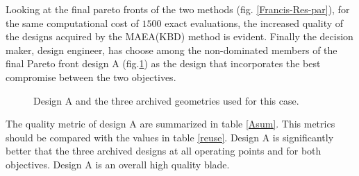 Looking at the final pareto fronts of the two methods (fig. \ref{Francis-Res-par}), for the same computational cost of $1500$ exact evaluations, the increased quality of the designs acquired by the MAEA(KBD) method is evident. Finally the decision maker, design engineer, has choose among the non-dominated members of the final Pareto front design A (fig.\ref{design-bases-a}) as the design that incorporates the best compromise between the two objectives.


\begin{figure}[h!]
\begin{minipage}[b]{1\linewidth}
 \centering
\end{minipage}
\caption{Design A and the three archived geometries used for this case.}
\label{design-bases-a}
\end{figure}

The quality metric of design A are summarized in table \ref{Asum}. This metrics should be compared with the values in table \ref{reuse}. Design A is significantly better that the three archived designs at all operating points and for both objectives. Design A is an overall high quality blade.


